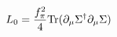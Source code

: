 \begin{equation}
\label{kinetic}
L_0={f_\pi^2\over 4}{\rm Tr}(\partial_\mu \Sigma^\dagger \partial_\mu \Sigma)
\end{equation}

